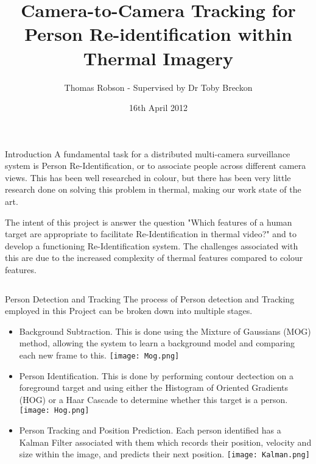 \documentclass[final]{beamer}
\title[Thermal Re-ID]{Camera-to-Camera Tracking for Person Re-identification within Thermal Imagery}
\author[G Ingram]{Thomas Robson - Supervised by Dr Toby Breckon}
\institute[Durham]{School of Engineering and Computing Sciences, Durham University}
\date{16th April 2012}
\begin{document}
  \begin{frame}{} 

  \vfill
  \begin{block}{Introduction}
          A fundamental task for a distributed multi-camera surveillance system is Person Re-Identification, or to associate people across different camera views. This has been well researched in colour, but there has been very little research done on solving this problem in thermal, making our work state of the art. 

The intent of this project is answer the question "Which features of a human target are appropriate to facilitate Re-Identification in thermal video?" and to develop a functioning Re-Identification system. The challenges associated with this are due to the increased complexity of thermal features compared to colour features.
        \end{block}
        
    \begin{columns}[t]
      \begin{column}{.48\linewidth}
        
        \begin{block}{Person Detection and Tracking}
        	The process of Person detection and Tracking employed in this Project can be broken down into multiple stages. 
        	\begin{itemize}
        	\item Background Subtraction. This is done using the Mixture of Gaussians (MOG) method, allowing the system to learn a background model and comparing each new frame to this. 
        	\texttt{[image: Mog.png]}
        	\item Person Identification. This is done by performing contour dectection on a foreground target and using either the Histogram of Oriented Gradients (HOG) or a Haar Cascade to determine whether this target is a person.
        	\texttt{[image: Hog.png]}
        	\item Person Tracking and Position Prediction. Each person identified has a Kalman Filter associated with them which records their position, velocity and size within the image, and predicts their next position. 
          \texttt{[image: Kalman.png]}
          \end{itemize}
        \end{block}
        
      \end{column}


\end{columns}
\end{frame}
\end{document}
